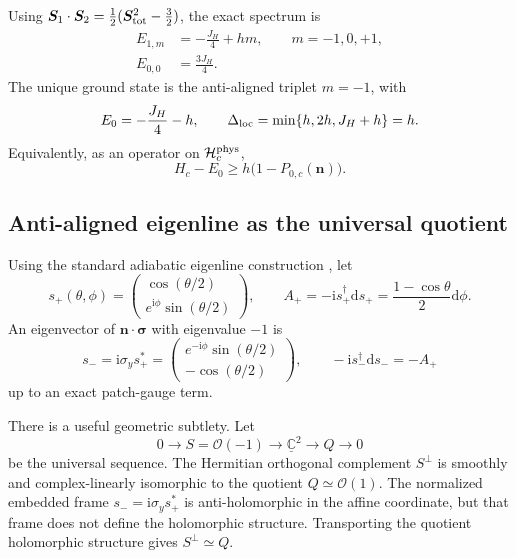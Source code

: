 \documentclass[11pt]{article}
\theoremstyle{definition}
\theoremstyle{remark}
\newcommand{\ii}{\mathrm i}
\newcommand{\dd}{\mathrm d}
\newcommand{\CC}{\mathbb C}
\newcommand{\cO}{\mathcal O}
\newcommand{\cH}{\mathcal H}
\begin{document}
Using
\(\bm S_1\cdot\bm S_2=\tfrac12(\bm S_{\rm tot}^2-\tfrac32)\), the exact
spectrum is
\begin{align}
 E_{1,m}&=-\frac{J_H}{4}+hm,\qquad m=-1,0,+1,\label{eq:triplet-spectrum}\\
 E_{0,0}&=\frac{3J_H}{4}.\label{eq:singlet-spectrum}
\end{align}
The unique ground state is the anti-aligned triplet \(m=-1\), with
\begin{equation}
 E_0=-\frac{J_H}{4}-h,\qquad
 \Delta_{\rm loc}=\min\{h,2h,J_H+h\}=h.
 \label{eq:local-gap}
\end{equation}
Equivalently, as an operator on \(\cH_c^{\rm phys}\),
\begin{equation}
 H_c-E_0\ge h\bigl(1-P_{0,c}(\bm n)\bigr).
 \label{eq:local-gap-operator}
\end{equation}

\subsection{Anti-aligned eigenline as the universal quotient}

Using the standard adiabatic eigenline construction
\cite{Berry1984APE3UV}, let
\begin{equation}
 s_+(\theta,\phi)=
 \begin{pmatrix}\cos(\theta/2)\\ e^{\ii\phi}\sin(\theta/2)\end{pmatrix},
 \qquad
 A_+=-\ii s_+^\dagger\dd s_+
 =\frac{1-\cos\theta}{2}\dd\phi.
 \label{eq:aligned-spinor}
\end{equation}
An eigenvector of \(\bm n\cdot\bm\sigma\) with eigenvalue \(-1\) is
\begin{equation}
 s_-=\ii\sigma_y s_+^*
 =\begin{pmatrix}e^{-\ii\phi}\sin(\theta/2)\\-\cos(\theta/2)\end{pmatrix},
 \qquad -\ii s_-^\dagger\dd s_-=-A_+
 \label{eq:anti-spinor}
\end{equation}
up to an exact patch-gauge term.

There is a useful geometric subtlety.  Let
\begin{equation}
 0\longrightarrow S=\cO(-1)
 \longrightarrow\underline{\CC}^{2}
 \longrightarrow Q\longrightarrow0
 \label{eq:universal-sequence}
\end{equation}
be the universal sequence.  The Hermitian orthogonal complement \(S^\perp\)
is smoothly and complex-linearly isomorphic to the quotient
\(Q\simeq\cO(1)\).  The normalized embedded frame \(s_-=\ii\sigma_y s_+^*\)
is anti-holomorphic in the affine coordinate, but that frame does not define
the holomorphic structure.  Transporting the quotient holomorphic structure
gives \(S^\perp\simeq Q\).
\end{document}

